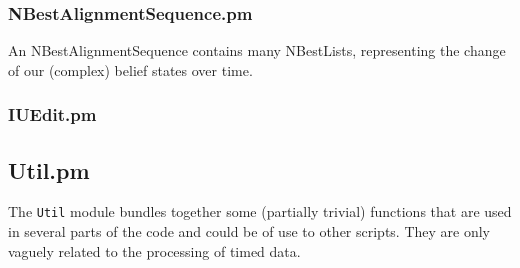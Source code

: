 \documentclass[a4,twoside=off,draft=true]{scrartcl}
\begin{document}
\subsubsection{NBestAlignmentSequence.pm}

An NBestAlignmentSequence contains many NBestLists, representing the change of 
our (complex) belief states over time.

\subsubsection{IUEdit.pm}

\subsection{Util.pm}

The {\tt Util} module bundles together some (partially trivial) functions that
are used in several parts of the code and could be of use to other scripts. They 
are only vaguely related to the processing of timed data.
\end{document}
